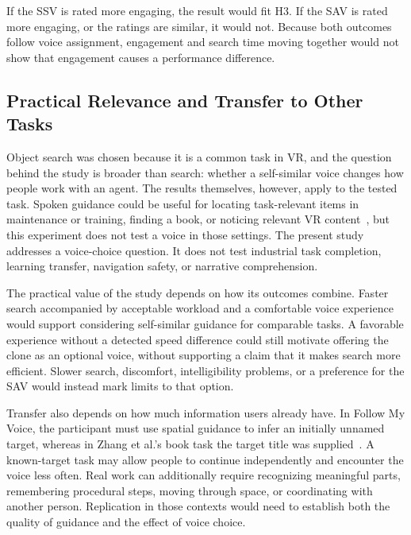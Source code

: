 If the SSV is rated more engaging, the result would fit H3. If the SAV is rated more engaging, or the ratings are similar, it would not. Because both outcomes follow voice assignment, engagement and search time moving together would not show that engagement causes a performance difference.

\subsection{Practical Relevance and Transfer to Other Tasks}
Object search was chosen because it is a common task in VR, and the question behind the study is broader than search: whether a self-similar voice changes how people work with an agent. The results themselves, however, apply to the tested task. Spoken guidance could be useful for locating task-relevant items in maintenance or training, finding a book, or noticing relevant VR content~\cite{binetti2021outofview,zhang2023seehear,lange2020hivefive}, but this experiment does not test a voice in those settings. The present study addresses a voice-choice question. It does not test industrial task completion, learning transfer, navigation safety, or narrative comprehension.

The practical value of the study depends on how its outcomes combine. Faster search accompanied by acceptable workload and a comfortable voice experience would support considering self-similar guidance for comparable tasks. A favorable experience without a detected speed difference could still motivate offering the clone as an optional voice, without supporting a claim that it makes search more efficient. Slower search, discomfort, intelligibility problems, or a preference for the SAV would instead mark limits to that option.

Transfer also depends on how much information users already have. In Follow My Voice, the participant must use spatial guidance to infer an initially unnamed target, whereas in Zhang et al.'s book task the target title was supplied~\cite{zhang2023seehear}. A known-target task may allow people to continue independently and encounter the voice less often. Real work can additionally require recognizing meaningful parts, remembering procedural steps, moving through space, or coordinating with another person. Replication in those contexts would need to establish both the quality of guidance and the effect of voice choice.
